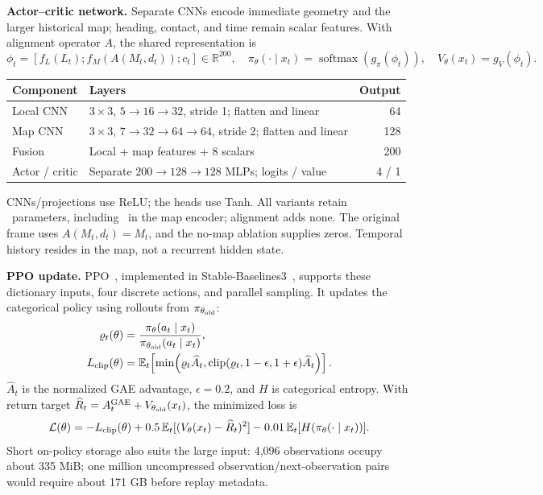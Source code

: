 \documentclass[10pt,a4paper]{article}
\newcommand{\subheading}[1]{\textbf{\color{ink}#1}\enspace}
\begin{document}
\subheading{Actor--critic network.} Separate CNNs encode immediate geometry and the larger historical map; heading, contact, and time remain scalar features. With alignment operator $A$, the shared representation is
\[
 \phi_t=[f_L(L_t);f_M(A(M_t,d_t));c_t]\in\mathbb R^{200},\quad
 \pi_\theta(\cdot\mid x_t)=\operatorname{softmax}(g_\pi(\phi_t)),\quad V_\theta(x_t)=g_V(\phi_t).
\]
\begin{center}\small
\begin{tabularx}{\linewidth}{@{}lXr@{}}\toprule
Component & Layers & Output\\\midrule
Local CNN & $3\times3$, $5\!\to\!16\!\to\!32$, stride 1; flatten and linear & 64\\
Map CNN & $3\times3$, $7\!\to\!32\!\to\!64\!\to\!64$, stride 2; flatten and linear & 128\\
Fusion & Local + map features + 8 scalars & 200\\
Actor / critic & Separate $200\!\to\!128\!\to\!128$ MLPs; logits / value & 4 / 1\\\bottomrule
\end{tabularx}
\end{center}
CNNs/projections use ReLU; the heads use Tanh. All variants retain \TotalParameters\ parameters, including \MapParameters\ in the map encoder; alignment adds none. The original frame uses $A(M_t,d_t)=M_t$, and the no-map ablation supplies zeros. Temporal history resides in the map, not a recurrent hidden state.

\subheading{PPO update.} PPO~\cite{ppo}, implemented in Stable-Baselines3~\cite{sb3}, supports these dictionary inputs, four discrete actions, and parallel sampling. It updates the categorical policy using rollouts from $\pi_{\theta_{\rm old}}$:
\[
 \begin{aligned}
 \varrho_t(\theta)&=\frac{\pi_\theta(a_t\mid x_t)}{\pi_{\theta_{\rm old}}(a_t\mid x_t)},\\
 L_{\rm clip}(\theta)&=\mathbb E_t\!\left[\min\!\left(\varrho_t\widehat A_t,
        \operatorname{clip}(\varrho_t,1-\epsilon,1+\epsilon)\widehat A_t\right)\right].
 \end{aligned}
\]
$\widehat A_t$ is the normalized GAE advantage, $\epsilon=0.2$, and $H$ is categorical entropy. With return target $\widehat R_t=A_t^{\rm GAE}+V_{\theta_{\rm old}}(x_t)$, the minimized loss is
\[
 \mathcal L(\theta)=-L_{\rm clip}(\theta)+0.5\,\mathbb E_t[(V_\theta(x_t)-\widehat R_t)^2]
    -0.01\,\mathbb E_t[H(\pi_\theta(\cdot\mid x_t))].
\]
 Short on-policy storage also suits the large input: 4,096 observations occupy about 335 MiB; one million uncompressed observation/next-observation pairs would require about 171 GB before replay metadata.
\end{document}
